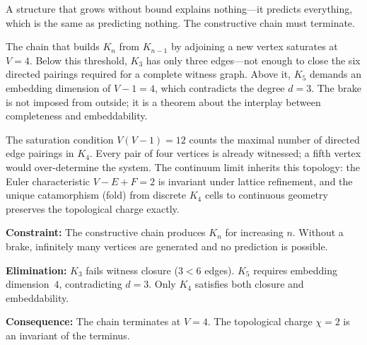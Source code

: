 \documentclass[11pt,a4paper]{book}
\begin{document}
A structure that grows without bound explains nothing---it predicts everything,
which is the same as predicting nothing.  The constructive chain must terminate.

The chain that builds $K_n$ from $K_{n-1}$ by adjoining a new vertex saturates
at $V = 4$.  Below this threshold, $K_3$ has only three edges---not enough to
close the six directed pairings required for a complete witness graph.  Above
it, $K_5$ demands an embedding dimension of $V - 1 = 4$, which contradicts
the degree $d = 3$.  The brake is not imposed from outside; it is a theorem
about the interplay between completeness and embeddability.

The saturation condition $V(V-1) = 12$ counts the maximal number of directed
edge pairings in $K_4$.  Every pair of four vertices is already witnessed;
a fifth vertex would over-determine the system.  The continuum limit inherits
this topology: the Euler characteristic $V - E + F = 2$ is invariant under
lattice refinement, and the unique catamorphism (fold) from discrete $K_4$
cells to continuous geometry preserves the topological charge exactly.

\textbf{Constraint:}
The constructive chain produces $K_n$ for increasing $n$.  Without a brake,
infinitely many vertices are generated and no prediction is possible.

\textbf{Elimination:}
$K_3$ fails witness closure ($3 < 6$ edges).  $K_5$ requires embedding
dimension~$4$, contradicting $d = 3$.  Only $K_4$ satisfies both closure
and embeddability.

\textbf{Consequence:}
The chain terminates at $V = 4$.  The topological charge $\chi = 2$ is
an invariant of the terminus.
\end{document}
